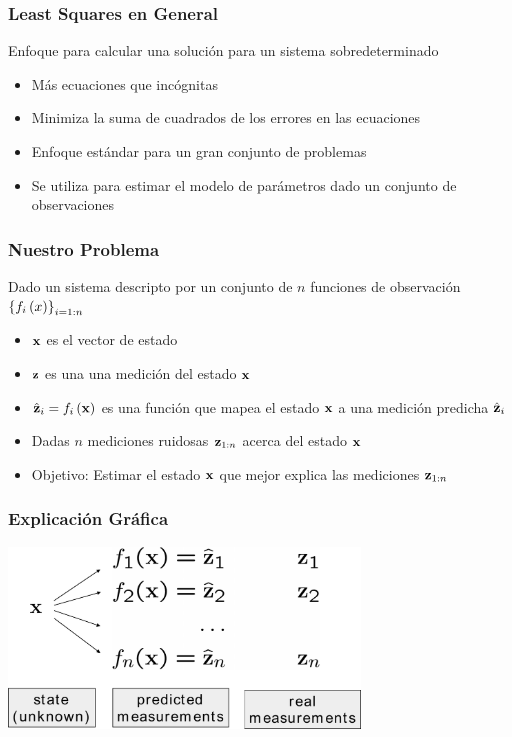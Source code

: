 \begin{frame}
    \frametitle{Least Squares en General}
    
    Enfoque para calcular una solución para un sistema sobredeterminado

    \begin{itemize}
        \item Más ecuaciones que incógnitas
        \item Minimiza la suma de cuadrados de los errores en las ecuaciones
        \item Enfoque estándar para un gran conjunto de problemas
        \item Se utiliza para estimar el modelo de parámetros dado un conjunto de observaciones
    \end{itemize}
\end{frame}

\begin{frame}
    \frametitle{Nuestro Problema}
    
    Dado un sistema descripto por un conjunto de $n$ funciones de observación $\left\{f_{i}\left(x\right)\right\}_{i=1:n}$

    \begin{itemize}
        \item $\boldsymbol{\mathbf{x}}$ es el vector de estado
        \item $\boldsymbol{\mathbf{z}}$ es una una medición del estado $\boldsymbol{\mathbf{x}}$
        \item $\hat{\boldsymbol{\mathbf{z}}}_{i} = f_{i}\left(\boldsymbol{\mathbf{x}}\right)$ es una función que mapea el estado $\boldsymbol{\mathbf{x}}$ a una medición predicha $\hat{\boldsymbol{\mathbf{z}}}_{i}$
        \item Dadas $n$ mediciones ruidosas $\boldsymbol{\mathbf{z}}_{1:n}$ acerca del estado $\boldsymbol{\mathbf{x}}$
        \item Objetivo: Estimar el estado $\boldsymbol{\mathbf{x}}$ que mejor explica las mediciones $\boldsymbol{\mathbf{z}}_{1:n}$
    \end{itemize}
\end{frame}

\begin{frame}
    \frametitle{Explicación Gráfica}
    
    \begin{center}
        \includegraphics[width=0.7\textwidth]{images/least_squares.pdf}
    \end{center}

\end{frame}

